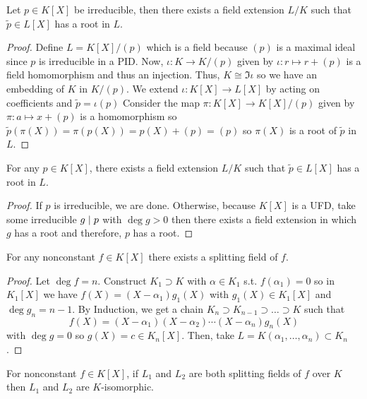 \documentclass[12pt]{extarticle}
\begin{document}
\begin{lemma}
Let $p \in K[X]$ be irreducible, then there exists a field extension $L/ K$ such that $\tilde{p} \in L[X]$ has a root in $L$.
\end{lemma}
\begin{proof}
Define $L = K[X]/(p)$ which is a field because $(p)$ is a maximal ideal since $p$ is irreducible in a PID. Now, $\iota : K \to K/(p)$ given by $\iota : r \mapsto r + (p)$ is a field homomorphism and thus an injection. Thus, $K \cong \Im{\iota}$ so we have an embedding of $K$ in $K/(p)$. We extend $\iota : K[X] \to L[X]$ by acting on coefficients and $\tilde{p} = \iota(p)$ Consider the map $\pi : K[X] \to K[X]/(p)$ given by $\pi : a \mapsto x + (p)$ is a homomorphism so $\tilde{p}(\pi(X)) = \pi(p(X)) = p(X) + (p) = (p)$ so $\pi(X)$ is a root of $\tilde{p}$ in $L$.   
\end{proof}

\begin{corollary}
For any $p \in K[X]$, there exists a field extension $L/ K$ such that $\tilde{p} \in L[X]$ has a root in $L$.
\end{corollary}
\begin{proof}
If $p$ is irreducible, we are done. Otherwise, because $K[X]$ is a UFD, take some irreducible $g \mid p$ with $\deg{g} > 0$ then there exists a field extension in which $g$ has a root and therefore, $p$ has a root. 
\end{proof}

\begin{theorem}
For any nonconstant $f \in K[X]$ there exists a splitting field of $f$.
\end{theorem}

\begin{proof}
Let $\deg{f} = n$. Construct $K_1 \supset K$ with $\alpha \in K_1$ s.t. $f(\alpha_1) = 0$ so in $K_1[X]$ we have $f(X) = (X - \alpha_1) g_1(X)$ with $g_1(X) \in K_1[X]$ and $\deg{g_n} = n-1$. By Induction, we get a chain $K_n \supset K_{n-1} \supset \dots \supset K$ such that \[f(X) = (X - \alpha_1)(X - \alpha_2) \cdots (X - \alpha_n) g_n(X)\] with $\deg{g} = 0$ so $g(X) = c \in K_n[X]$. Then, take $L = K(\alpha_1, \dots, \alpha_n) \subset K_n$. 
\end{proof}

\begin{theorem}
For nonconstant $f \in K[X]$, if $L_1$ and $L_2$ are both splitting fields of $f$ over $K$ then $L_1$ and $L_2$ are $K$-isomorphic.
\end{theorem}
\end{document}
